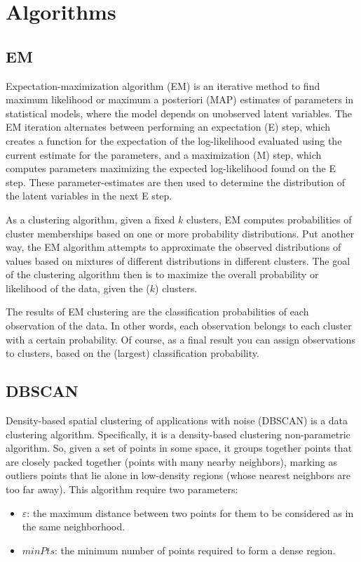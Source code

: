 \section{Algorithms}
\label{sec:algorithms}
\subsection{EM}
Expectation-maximization algorithm (EM) \cite{em,wiki_em,rapid_em} is an iterative method to find maximum likelihood or maximum a posteriori (MAP) estimates of parameters in statistical models, where the model depends on unobserved latent variables. The EM iteration alternates between performing an expectation (E) step, which creates a function for the expectation of the log-likelihood evaluated using the current estimate for the parameters, and a maximization (M) step, which computes parameters maximizing the expected log-likelihood found on the E step. These parameter-estimates are then used to determine the distribution of the latent variables in the next E step.

As a clustering algorithm, given a fixed $k$ clusters, EM computes probabilities of cluster memberships based on one or more probability distributions. Put another way, the EM algorithm attempts to approximate the observed distributions of values based on mixtures of different distributions in different clusters. The goal of the clustering algorithm then is to maximize the overall probability or likelihood of the data, given the ($k$) clusters.

The results of EM clustering are the classification probabilities of each observation of the data. In other words, each observation belongs to each cluster with a certain probability. Of course, as a final result you can assign observations to clusters, based on the (largest) classification probability.

\subsection{DBSCAN}
Density-based spatial clustering of applications with noise (DBSCAN) \cite{dbscan,wiki_dbscan} is a data clustering algorithm. Specifically, it is a density-based clustering non-parametric algorithm. So, given a set of points in some space, it groups together points that are closely packed together (points with many nearby neighbors), marking as outliers points that lie alone in low-density regions (whose nearest neighbors are too far away). This algorithm require two parameters:
\begin{itemize}
    \item $\varepsilon$: the maximum distance between two points for them to be considered as in the same neighborhood.
    \item $minPts$: the minimum number of points required to form a dense region.
\end{itemize}

